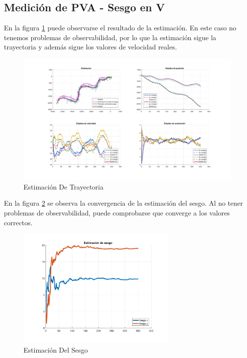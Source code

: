 \subsection{Medición de PVA - Sesgo en V}

	En la figura \ref{fig:ej4d} puede observarse el resultado de la estimación. En este caso no tenemos problemas de observabilidad, por lo que la estimación sigue la trayectoria y además sigue los valores de velocidad reales.

	\begin{figure}[H]
		\centering
		\includegraphics[scale=0.5,trim={6,5cm 0 0 0}]{Figuras/graf_ej4d.pdf}
		\caption{Estimación De Trayectoria}
		\label{fig:ej4d}
	\end{figure}
	
	En la figura \ref{fig:ej4d_bias} se observa la convergencia de la estimación del sesgo. Al no tener problemas de observabilidad, puede comprobarse que converge a los valores correctos.
	
	\begin{figure}[H]
		\centering
		\includegraphics[width=0.7\textwidth,keepaspectratio]{Figuras/bias_ej4d.pdf}
		\caption{Estimación Del Sesgo}
		\label{fig:ej4d_bias}
	\end{figure}
	
